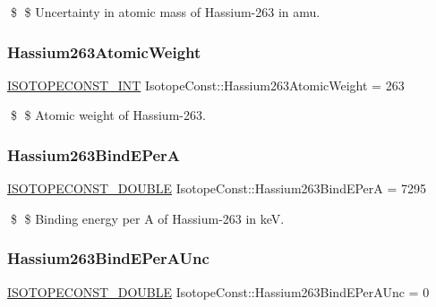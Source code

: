 \$ \$ Uncertainty in atomic mass of Hassium-\/263 in amu. \mbox{\label{group___isotope_const-_hassium-_hs263_gac920c60c54a60b03f1fa71af5a99dd31}} 
\subsubsection{\texorpdfstring{Hassium263\+Atomic\+Weight}{Hassium263AtomicWeight}}
{\footnotesize\ttfamily \mbox{\hyperlink{group___isotope_const-_macros_ga5f18360b3e99483a35c32d789e62621c}{I\+S\+O\+T\+O\+P\+E\+C\+O\+N\+S\+T\+\_\+\+I\+NT}} Isotope\+Const\+::\+Hassium263\+Atomic\+Weight = 263}

\$ \$ Atomic weight of Hassium-\/263. \mbox{\label{group___isotope_const-_hassium-_hs263_ga953e90d1d2ffac58fabc3e985657861c}} 
\subsubsection{\texorpdfstring{Hassium263\+Bind\+E\+PerA}{Hassium263BindEPerA}}
{\footnotesize\ttfamily \mbox{\hyperlink{group___isotope_const-_macros_ga8f45a7272ce02c0b4c65c44636ed719a}{I\+S\+O\+T\+O\+P\+E\+C\+O\+N\+S\+T\+\_\+\+D\+O\+U\+B\+LE}} Isotope\+Const\+::\+Hassium263\+Bind\+E\+PerA = 7295}

\$ \$ Binding energy per A of Hassium-\/263 in keV. \mbox{\label{group___isotope_const-_hassium-_hs263_ga57c004258900b6806e74571543a82c1e}} 
\subsubsection{\texorpdfstring{Hassium263\+Bind\+E\+Per\+A\+Unc}{Hassium263BindEPerAUnc}}
{\footnotesize\ttfamily \mbox{\hyperlink{group___isotope_const-_macros_ga8f45a7272ce02c0b4c65c44636ed719a}{I\+S\+O\+T\+O\+P\+E\+C\+O\+N\+S\+T\+\_\+\+D\+O\+U\+B\+LE}} Isotope\+Const\+::\+Hassium263\+Bind\+E\+Per\+A\+Unc = 0}

